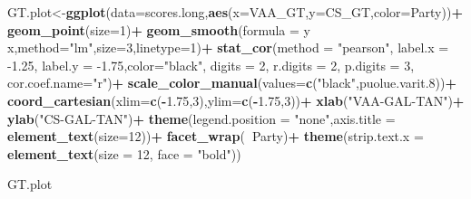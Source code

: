 \documentclass[
]{article}
\newenvironment{Shaded}{\begin{snugshade}}{\end{snugshade}}
\newcommand{\DataTypeTok}[1]{\textcolor[rgb]{0.13,0.29,0.53}{#1}}
\newcommand{\DecValTok}[1]{\textcolor[rgb]{0.00,0.00,0.81}{#1}}
\newcommand{\FloatTok}[1]{\textcolor[rgb]{0.00,0.00,0.81}{#1}}
\newcommand{\KeywordTok}[1]{\textcolor[rgb]{0.13,0.29,0.53}{\textbf{#1}}}
\newcommand{\NormalTok}[1]{#1}
\newcommand{\OperatorTok}[1]{\textcolor[rgb]{0.81,0.36,0.00}{\textbf{#1}}}
\newcommand{\StringTok}[1]{\textcolor[rgb]{0.31,0.60,0.02}{#1}}
\begin{document}
\begin{Shaded}
\begin{Highlighting}[]
\NormalTok{GT.plot<-}\KeywordTok{ggplot}\NormalTok{(}\DataTypeTok{data=}\NormalTok{scores.long,}\KeywordTok{aes}\NormalTok{(}\DataTypeTok{x=}\NormalTok{VAA_GT,}\DataTypeTok{y=}\NormalTok{CS_GT,}\DataTypeTok{color=}\NormalTok{Party))}\OperatorTok{+}
\StringTok{  }\KeywordTok{geom_point}\NormalTok{(}\DataTypeTok{size=}\DecValTok{1}\NormalTok{)}\OperatorTok{+}
\StringTok{  }\KeywordTok{geom_smooth}\NormalTok{(}\DataTypeTok{formula =}\NormalTok{ y }\OperatorTok{~}\StringTok{ }\NormalTok{x,}\DataTypeTok{method=}\StringTok{"lm"}\NormalTok{,}\DataTypeTok{size=}\DecValTok{3}\NormalTok{,}\DataTypeTok{linetype=}\DecValTok{1}\NormalTok{)}\OperatorTok{+}
\StringTok{  }\KeywordTok{stat_cor}\NormalTok{(}\DataTypeTok{method =} \StringTok{"pearson"}\NormalTok{, }\DataTypeTok{label.x =} \FloatTok{-1.25}\NormalTok{, }\DataTypeTok{label.y =} \FloatTok{-1.75}\NormalTok{,}\DataTypeTok{color=}\StringTok{"black"}\NormalTok{,}
           \DataTypeTok{digits =} \DecValTok{2}\NormalTok{,}
           \DataTypeTok{r.digits =} \DecValTok{2}\NormalTok{,}
           \DataTypeTok{p.digits =} \DecValTok{3}\NormalTok{,}
           \DataTypeTok{cor.coef.name=}\StringTok{"r"}\NormalTok{)}\OperatorTok{+}
\StringTok{  }\KeywordTok{scale_color_manual}\NormalTok{(}\DataTypeTok{values=}\KeywordTok{c}\NormalTok{(}\StringTok{"black"}\NormalTok{,puolue.varit}\FloatTok{.8}\NormalTok{))}\OperatorTok{+}
\StringTok{  }\KeywordTok{coord_cartesian}\NormalTok{(}\DataTypeTok{xlim=}\KeywordTok{c}\NormalTok{(}\OperatorTok{-}\FloatTok{1.75}\NormalTok{,}\DecValTok{3}\NormalTok{),}\DataTypeTok{ylim=}\KeywordTok{c}\NormalTok{(}\OperatorTok{-}\FloatTok{1.75}\NormalTok{,}\DecValTok{3}\NormalTok{))}\OperatorTok{+}
\StringTok{  }\KeywordTok{xlab}\NormalTok{(}\StringTok{"VAA-GAL-TAN"}\NormalTok{)}\OperatorTok{+}
\StringTok{  }\KeywordTok{ylab}\NormalTok{(}\StringTok{"CS-GAL-TAN"}\NormalTok{)}\OperatorTok{+}
\StringTok{  }\KeywordTok{theme}\NormalTok{(}\DataTypeTok{legend.position =} \StringTok{"none"}\NormalTok{,}\DataTypeTok{axis.title =} \KeywordTok{element_text}\NormalTok{(}\DataTypeTok{size=}\DecValTok{12}\NormalTok{))}\OperatorTok{+}
\StringTok{  }\KeywordTok{facet_wrap}\NormalTok{(}\OperatorTok{~}\NormalTok{Party)}\OperatorTok{+}
\StringTok{  }\KeywordTok{theme}\NormalTok{(}\DataTypeTok{strip.text.x =} 
          \KeywordTok{element_text}\NormalTok{(}\DataTypeTok{size =} \DecValTok{12}\NormalTok{, }\DataTypeTok{face =} \StringTok{"bold"}\NormalTok{))}

\NormalTok{GT.plot}
\end{Highlighting}
\end{Shaded}
\end{document}

